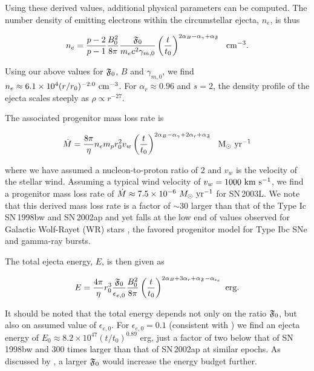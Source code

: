 \documentclass[12pt,preprint]{aastex}
\begin{document}
Using these derived values, additional physical parameters can be
computed.  The number density of emitting electrons within the
circumstellar ejecta, $n_e$, is thus

\begin{equation}
n_e=\frac{p-2}{p-1} \frac{B_0^2}{8\pi} \frac{\frak{F}_0}{m_e c^2 \gamma_{m,0}} \left(\frac{t}{t_0}\right)^{2\alpha_B-\alpha_{\gamma}+\alpha_{\frak{F}}}~~\rm cm^{-3}.
\label{eqn:n_e}
\end{equation}

\noindent
Using our above values for $\frak{F}_0$, $B$ and $\gamma_{m,0}$, we find
$n_e\approx 6.1 \times 10^{4} (r/r_0)^{-2.0}~\rm cm^{-3}$.    For
$\alpha_r\approx 0.96$ and $s=2$, the density profile of
the ejecta scales steeply as $\rho \propto r^{-27}$.


The associated progenitor mass loss rate is 

\begin{equation}
\dot{M}=\frac{8\pi}{\eta} n_e m_p r_0^2 v_w \left(\frac{t}{t_0}\right)^{2\alpha_B-\alpha_{\gamma}+2\alpha_r+\alpha_{\frak{F}}}~~\rm M_{\odot}~yr^{-1}
\end{equation}
\label{eqn:m_dot}

\noindent
where we have assumed a nucleon-to-proton ratio of 2 and $v_w$ is the
velocity of the stellar wind.  Assuming a typical wind velocity of
$v_w=1000~\rm km~s^{-1}$, we find a progenitor mass loss rate of
$\dot{M}\approx 7.5\times 10^{-6}~M_{\odot}~\rm yr^{-1}$ for
SN\,2003L.  We note that this derived mass loss rate is a factor of
$\sim 30$ larger than that of the Type Ic SN\,1998bw and SN\,2002ap
and yet falls at the low end of values observed for Galactic
Wolf-Rayet (WR) stars \citep{cgv04}, the favored progenitor model for
Type Ibc SNe and gamma-ray bursts.

\noindent
The total ejecta energy, $E$, is then given as

\begin{equation}
E=\frac{4\pi}{\eta} r_0^3 \frac{\frak{F}_0}{\epsilon_{e,0}} \frac{B_0^2}{8\pi} \left(\frac{t}{t_0}\right)^{2\alpha_B+3\alpha_r+\alpha_{\frak{F}}-\alpha_{\epsilon_e}}~\rm erg.
\label{eqn:energy}
\end{equation}

\noindent
It should be noted that the total energy depends not only on the
ratio $\frak{F}_0$, but also on assumed value of $\epsilon_{e,0}$.
For $\epsilon_{e,0}=0.1$ (consistent with \citealt{lc99,bkc02})
we find an ejecta energy of $E_0\approx 8.2\times 10^{47}
(t/t_0)^{0.89}$ erg, just a factor of two below that of SN\,1998bw and
300 times larger than that of SN\,2002ap at similar epochs.  As
discussed by \citet{lc99}, a larger
$\frak{F}_0$ would increase the energy budget further.  
\end{document}
